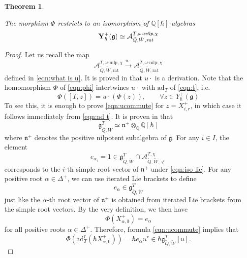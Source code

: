 \documentclass{amsart}
\newtheorem{theorem}{Theorem}[section]
\def\fg{{\mathfrak{g}}}
\def\fn{{\mathfrak{n}}}
\def\BQ{{\mathbb{Q}}}
\def\bs{\boldsymbol{\varsigma}}
\def\tbps{\mathfrak{g}^T_{\tilde{Q},\tilde{W}}}
\begin{document}
\medskip 

\begin{theorem}
\label{thm:ade}

The morphism $\Phi$ restricts to an isomorphism of $\mathbb{Q}[\hbar]$-algebras 
\begin{equation}
\label{eqn:ade}
\mathbf{Y}^+_{\hbar}(\fg) \simeq \mathcal{A}^{T,\omega\emph{-nilp},\chi}_{\tilde{Q},\tilde{W},\emph{rat}} 
\end{equation}


\end{theorem}

\medskip 

\begin{proof} Let us recall the map
$$ 
\mathcal{A}^{T,\omega\text{-nilp},\chi}_{\tilde{Q},\tilde{W},\text{rat}}  \xrightarrow{u \cdot} \mathcal{A}^{T,\omega\text{-nilp},\chi}_{\tilde{Q},\tilde{W},\text{rat}}
$$ 
defined in \eqref{eqn:what is u}. It is proved in \cite[Proposition 4.1]{DW} that $u \cdot$ is a derivation. Note that the homomorphism $\Phi$ of \eqref{eqn:phi} intertwines $u \cdot $ with $\text{ad}_T$ of \eqref{eqn:t}, i.e. 
\begin{equation} 
\label{eqn:ucommute}
  \Phi \left([T,z]\right) = u \cdot \left(\Phi(z)\right), \qquad \forall z \in Y_{\hbar}^+(\fg)  
\end{equation}
To see this, it is enough to prove \eqref{eqn:ucommute} for $z = X_{i,r}^+$, in which case it follows immediately from \eqref{eqn:ad t}. It is proven in \cite{davison2022bps} that 
\begin{equation}
\label{eqn:iso lie}
\tbps \simeq \fn^+ \otimes_{\BQ} \mathbb{Q}[\hbar]
\end{equation}
where $\mathfrak{n}^+$ denotes the positive nilpotent subalgebra of $\fg$. For any $i \in I$, the element 
$$
e_{\alpha_i} = 1 \in \tbps \cap \mathcal{A}^{T,\chi}_{\tilde{Q},\tilde{W},\bs^i}
$$
corresponds to the $i$-th simple root vector of $\fn^+$ under \eqref{eqn:iso lie}. For any positive root $\alpha \in \Delta^+$, we can use iterated Lie brackets to define
$$
e_{\alpha} \in \tbps
$$
just like the $\alpha$-th root vector of $\fn^+$ is obtained from iterated Lie brackets from the simple root vectors. By the very definition, we then have
$$
\Phi(X^+_{\alpha,0}) = e_{\alpha}
$$
for all positive roots $\alpha \in \Delta^+$. Therefore, formula \eqref{eqn:ucommute} implies that
\begin{equation}
\label{eqn:jump}
\Phi(\mathrm{ad}_T^r(\hbar X^+_{\alpha,0})) = \hbar e_{\alpha} u^r \in \hbar \tbps[u].
\end{equation}

\end{proof}
\end{document}
